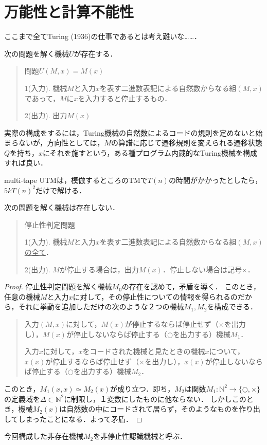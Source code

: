 \documentclass[uplatex, 12pt, dvipdfmx]{jsreport}
\begin{document}
\section{万能性と計算不能性}
ここまで全てTuring (1936)の仕事であるとは考え難いな……．

\begin{theorem}[UTMの存在]
    次の問題を解く機械$U$が存在する．\cite{Turing-OnComputableNumbers}
    \begin{quotation}
        問題$U(M,x)=M(x)$

        1(入力). 機械$M$と入力$x$を表す二進数表記による自然数からなる組$(M,x)$であって，$M$に$x$を入力すると停止するもの．

        2(出力). 出力$M(x)$
    \end{quotation}
\end{theorem}
実際の構成をするには，Turing機械の自然数によるコードの規則を定めないと始まらないが，方向性としては，$M$の算譜に応じて遷移規則を変えられる遷移状態$Q$を持ち，$x$にそれを施すという，ある種プログラム内蔵的なTuring機械を構成すれば良い．
\begin{remark}
    multi-tape UTMは，模倣するところのTMで$T(n)$の時間がかかったとしたら，$5kT(n)^2$だけで解ける．
\end{remark}

\begin{theorem}[停止性判定機械の非存在]
    次の問題を解く機械は存在しない．
    \begin{quotation}停止性判定問題

        1(入力). 機械$M$と入力$x$を表す二進数表記による自然数からなる組$(M,x)$\underline{の全て}．

        2(出力). $M$が停止する場合は，出力$M(x)$．停止しない場合は記号$\times$．
    \end{quotation}
\end{theorem}
\begin{proof}
    停止性判定問題を解く機械$M_0$の存在を認めて，矛盾を導く．
    このとき，任意の機械$M$と入力$x$に対して，その停止性についての情報を得られるのだから，それに挙動を追加しただけの次のような２つの機械$M_1,M_2$を構成できる．

    \begin{quotation}
        入力$(M,x)$に対して，$M(x)$が停止するならば停止せず（$\times$を出力し），$M(x)$が停止しないならば停止する（$\bigcirc$を出力する）機械$M_1$．

        入力$x$に対して，$x$をコードされた機械と見たときの機械$x$について，$x(x)$が停止するならば停止せず（$\times$を出力し），$x(x)$が停止しないならば停止する（$\bigcirc$を出力する）機械$M_2$．
    \end{quotation}

    このとき，$M_1(x,x)\simeq M_2(x)$が成り立つ．即ち，$M_2$は関数$M_1:\mathbb{N}^2\to\{\bigcirc,\times\}$の定義域を$\Delta\subset\mathbb{N}^2$に制限し，１変数にしたものに他ならない．
    しかしこのとき，機械$M_2(x)$は自然数の中にコードされて居らず，そのようなものを作り出してしまったことになる．よって矛盾．
\end{proof}
\begin{remark}
    今回構成した非存在機械$M_2$を非停止性認識機械と呼ぶ．
\end{remark}
\end{document}
